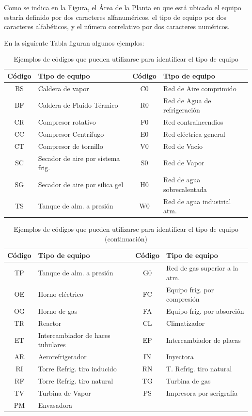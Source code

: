 \documentclass[../main]{subfiles}
\begin{document}
Como se indica en la Figura, el Área de la Planta en que está ubicado
el equipo estaría definido por dos caracteres alfanuméricos, el tipo de
equipo por dos caracteres alfabéticos, y el número correlativo por dos caracteres numéricos.

En la siguiente Tabla figuran algunos ejemplos:

\begin{table}[h!]
    \centering
    \begin{tabular}{|c|l|c|l|}\hline
Código & Tipo de equipo & Código & Tipo de equipo\\\hline
BS & Caldera de vapor & C0 &Red de Aire comprimido \\
BF & Caldera de Fluido Térmico & R0 & Red de Agua de refrigeración \\
CR & Compresor rotativo &F0 &Red contraincendios\\
CC & Compresor Centrífugo & E0 & Red eléctrica general\\
CT & Compresor de tornillo & V0 & Red de Vacío\\
SC &Secador de aire por sistema frig. & S0 & Red de Vapor \\
SG &Secador de aire por silica gel &H0& Red de agua sobrecalentada \\
TS &Tanque de alm. a presión &W0& Red de agua industrial
atm.\\ \hline


    \end{tabular}
    \caption{Ejemplos de códigos que pueden
utilizarse para identificar el tipo de equipo}
    
\end{table}

\begin{table}[h!]
    \centering
    \begin{tabular}{|c|l|c|l|}\hline
Código & Tipo de equipo & Código & Tipo de equipo\\\hline
TP &Tanque de alm. a presión &G0& Red de gas
superior a la atm.\\
OE& Horno eléctrico &FC& Equipo frig. por compresión\\
OG& Horno de gas &FA& Equipo frig. por absorción\\
TR& Reactor &CL& Climatizador\\
ET& Intercambiador de haces tubulares &EP& Intercambiador de placas\\
AR& Aerorefrigerador &IN& Inyectora\\
RI& Torre Refrig. tiro inducido &RN& T. Refrig. tiro natural\\
RF& Torre Refrig. tiro natural &TG& Turbina de gas\\
TV& Turbina de Vapor &PS& Impresora por serigrafía\\
PM& Envasadora & & \\ \hline
    \end{tabular}
    \caption{Ejemplos de códigos que pueden
utilizarse para identificar el tipo de equipo (continuación)}
   
\end{table}
\end{document}
